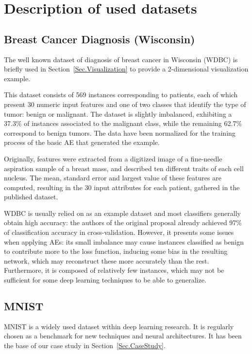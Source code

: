 \documentclass[preprint,5p,compress]{elsarticle}
\begin{document}
\clearpage

\appendix
\section{Description of used datasets}

\subsection{Breast Cancer Diagnosis (Wisconsin)}

The well known dataset of diagnosis of breast cancer in Wisconsin (WDBC) \cite{WDBC} is briefly used in Section~\ref{Sec.Visualization} to provide a 2-dimensional visualization example.

This dataset consists of 569 instances corresponding to patients, each of which present 30 numeric input features and one of two classes that identify the type of tumor: benign or malignant. The dataset is slightly imbalanced, exhibiting a 37.3\% of instances associated to the malignant class, while the remaining 62.7\% correspond to benign tumors. The data have been normalized for the training process of the basic AE that generated the example.

Originally, features were extracted from a digitized image of a fine-needle aspiration sample of a breast mass, and described ten different traits of each cell nucleus. The mean, standard error and largest value of these features are computed, resulting in the 30 input attributes for each patient, gathered in the published dataset.

WDBC is usually relied on as an example dataset and most classifiers generally obtain high accuracy: the authors of the original proposal already achieved 97\% of classification accuracy in cross-validation. However, it presents some issues when applying AEs: its small imbalance may cause instances classified as benign to contribute more to the loss function, inducing some bias in the resulting network, which may reconstruct these more accurately than the rest. Furthermore, it is composed of relatively few instances, which may not be sufficient for some deep learning techniques to be able to generalize.

\subsection{MNIST}

MNIST \cite{MNIST} is a widely used dataset within deep learning research. It is regularly chosen as a benchmark for new techniques and neural architectures. It has been the base of our case study in Section~\ref{Sec.CaseStudy}.
\end{document}
